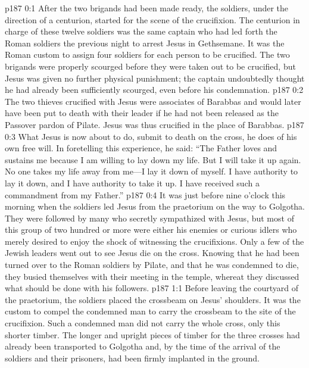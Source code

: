 \author{Midwayer Commission}
\vs p187 0:1 After the two brigands had been made ready, the soldiers, under the direction of a centurion, started for the scene of the crucifixion. The centurion in charge of these twelve soldiers was the same captain who had led forth the Roman soldiers the previous night to arrest Jesus in Gethsemane. It was the Roman custom to assign four soldiers for each person to be crucified. The two brigands were properly scourged before they were taken out to be crucified, but Jesus was given no further physical punishment; the captain undoubtedly thought he had already been sufficiently scourged, even before his condemnation.
\vs p187 0:2 The two thieves crucified with Jesus were associates of Barabbas and would later have been put to death with their leader if he had not been released as the Passover pardon of Pilate. Jesus was thus crucified in the place of Barabbas.
\vs p187 0:3 What Jesus is now about to do, submit to death on the cross, he does of his own free will. In foretelling this experience, he said: \textcolor{ubdarkred}{“The Father loves and sustains me because I am willing to lay down my life. But I will take it up again. No one takes my life away from me---I lay it down of myself. I have authority to lay it down, and I have authority to take it up. I have received such a commandment from my Father.”}
\vs p187 0:4 It was just before nine o’clock this morning when the soldiers led Jesus from the praetorium on the way to Golgotha. They were followed by many who secretly sympathized with Jesus, but most of this group of two hundred or more were either his enemies or curious idlers who merely desired to enjoy the shock of witnessing the crucifixions. Only a few of the Jewish leaders went out to see Jesus die on the cross. Knowing that he had been turned over to the Roman soldiers by Pilate, and that he was condemned to die, they busied themselves with their meeting in the temple, whereat they discussed what should be done with his followers.\plusone
{}
\vs p187 1:1 Before leaving the courtyard of the praetorium, the soldiers placed the crossbeam on Jesus’ shoulders. It was the custom to compel the condemned man to carry the crossbeam to the site of the crucifixion. Such a condemned man did not carry the whole cross, only this shorter timber. The longer and upright pieces of timber for the three crosses had already been transported to Golgotha and, by the time of the arrival of the soldiers and their prisoners, had been firmly implanted in the ground.
